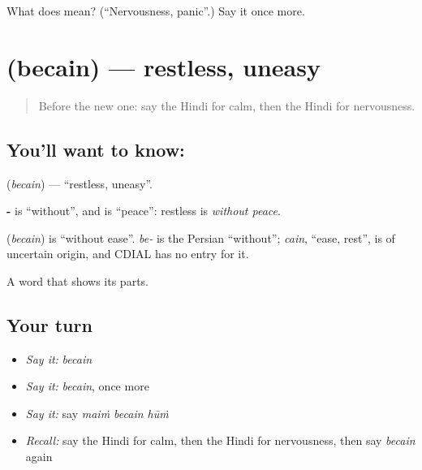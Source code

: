 \begin{tcolorbox}[breakable,colback=teal!4,colframe=teal!35!black,title={Before you move on}]
What does  mean? (\textquotedblleft{}Nervousness, panic\textquotedblright{}.) Say it once more.
\end{tcolorbox}
\section[\texorpdfstring{\hi{बेचैन} (becain)}{बेचैन (becain)}]{ (becain) — restless, uneasy}

\label{lesson:HI-C125-bechain}



\begin{quote}
Before the new one: say the Hindi for calm, then the Hindi for nervousness.
\end{quote}

\subsection*{You'll want to know: }
\textbf{} (\emph{becain}) — \textquotedblleft{}restless, uneasy\textquotedblright{}.

\textbf{-} is \textquotedblleft{}without\textquotedblright{}, and \textbf{} is \textquotedblleft{}peace\textquotedblright{}: restless is \emph{without peace}.

\begin{cousinweb}
\textbf{} (\emph{becain}) is \textquotedblleft{}without ease\textquotedblright{}. \emph{be-} is the Persian \textquotedblleft{}without\textquotedblright{}; \emph{cain}, \textquotedblleft{}ease, rest\textquotedblright{}, is of uncertain origin, and CDIAL has no entry for it.
\end{cousinweb}

\begin{grammarlens}[title={What you've built}]
A word that shows its parts.
\end{grammarlens}

\subsection*{Your turn}
\begin{itemize}
\raggedright
  \item \emph{Say it:} \emph{becain}
  \item \emph{Say it:} \emph{becain}, once more
  \item \emph{Say it:} say \emph{maiṁ becain hūṁ}
  \item \emph{Recall:} say the Hindi for calm, then the Hindi for nervousness, then say \emph{becain} again
\end{itemize}

